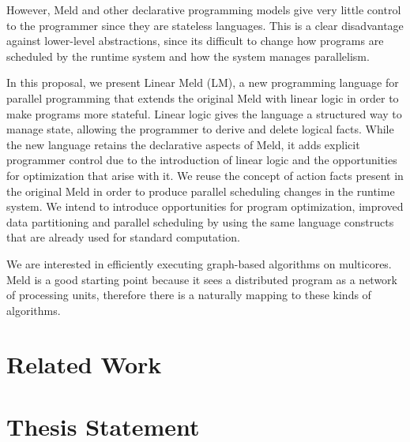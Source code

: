 However, Meld and other declarative programming models give very little control to the programmer since they are stateless languages.
This is a clear disadvantage against lower-level abstractions, since its difficult to change how programs are scheduled by
the runtime system and how the system manages parallelism.

In this proposal, we present Linear Meld (LM), a new programming language for parallel programming that extends the
original Meld with linear logic in order to make programs more stateful. Linear logic gives the language a structured
way to manage state, allowing the programmer to derive and delete logical facts.
While the new language retains the declarative aspects of Meld, it adds explicit programmer control
due to the introduction of linear logic and the opportunities for optimization that arise with it.
We reuse the concept of action facts present in the original Meld in order to produce parallel scheduling changes
in the runtime system. We intend to introduce opportunities for program optimization, improved data partitioning and
parallel scheduling by using the same language constructs that are already used for standard computation.

We are interested in efficiently executing graph-based algorithms on multicores. Meld is a good
starting point because it sees a distributed program as a network of processing units, therefore
there is a naturally mapping to these kinds of algorithms.

\section{Related Work}



\section{Thesis Statement}



